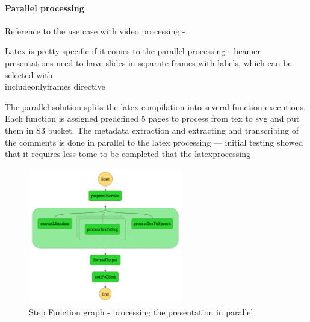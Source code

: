 \paragraph{Parallel processing}

Reference to the use case with video processing - \cite{ServerlessArchitectureOnAWSSecondEdition}

Latex is pretty specific if it comes to the parallel processing - beamer presentations need to have slides in separate frames with labels, which can be selected with \\includeonlyframes directive

The parallel solution splits the latex compilation into several function executions. Each function is assigned predefined 5 pages to process from tex to svg and put them in S3 bucket. The metadata extraction and extracting and transcribing of the comments is done in parallel to the latex processing --- initial testing showed that it requires less tome to be completed that the latexprocessing

\begin{figure}[H]
    \centering
    \includegraphics[width=0.6\textwidth]{assets/04-serverless-for-web-apps/stepFunctionGraphParallel.png}
    \caption{Step Function graph - processing the presentation in parallel}
    \label{fig:step-function-processing-the-presentation-in-parallel}
\end{figure}

\datasetSingleVsParallel

